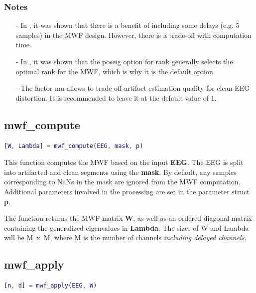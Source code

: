 \documentclass[11pt]{article}
\begin{document}
\subsubsection{Notes}

\begin{itemize}[noitemsep]
\item[-] In \cite{somers2018generic}, it was shown that there is a benefit of including some delays (e.g. 5 samples) in the MWF design. However, there is a trade-off with computation time.
\item[-] In \cite{somers2018generic}, it was shown that the poseig option for rank generally selects the optimal rank for the MWF, which is why it is the default option.
\item[-] The factor mu allows to trade off artifact estimation quality for clean EEG distortion. It is recommended to leave it at the default value of 1.
\end{itemize}

\newpage
\subsection{mwf\_compute}
\label{mwfcompute}

\begin{lstlisting}[frame=single, language=matlab]
[W, Lambda] = mwf_compute(EEG, mask, p)
\end{lstlisting}

This function computes the MWF based on the input \textbf{EEG}. The EEG is split into artifacted and clean segments using the \textbf{mask}. By default, any samples corresponding to NaNs in the mask are ignored from the MWF computation. Additional parameters involved in the processing are set in the parameter struct \textbf{p}.

The function returns the MWF matrix \textbf{W}, as well as an ordered diagonal matrix containing the generalized eigenvalues in \textbf{Lambda}. The sizes of W and Lambda will be M~x~M, where M is the number of channels \emph{including delayed channels}. 

\subsection{mwf\_apply}

\begin{lstlisting}[frame=single, language=matlab]
[n, d] = mwf_apply(EEG, W)
\end{lstlisting}
\end{document}

